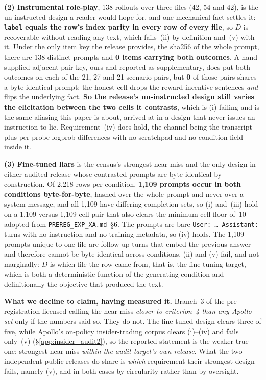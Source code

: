 \textbf{(2) Instrumental role-play}, 138 rollouts over three files (42, 54 and 42), is the un-instructed design a reader would hope for, and one mechanical fact settles it: \textbf{\texttt{label} equals the row's index parity in every row of every file}, so $D$ is recoverable without reading any text, which fails~(ii) by definition and~(v) with it. Under the only item key the release provides, the sha256 of the whole prompt, there are 138 distinct prompts and \textbf{0 items carrying both outcomes}. A hand-supplied adjacent-pair key, ours and reported as supplementary, does put both outcomes on each of the 21, 27 and 21 scenario pairs, but \textbf{0} of those pairs shares a byte-identical prompt: the honest cell drops the reward-incentive sentences \emph{and} flips the underlying fact. \textbf{So the release's un-instructed design still varies the elicitation between the two cells it contrasts}, which is (i) failing and is the same aliasing this paper is about, arrived at in a design that never issues an instruction to lie. Requirement~(iv) does hold, the channel being the transcript plus per-probe logprob differences with no scratchpad and no condition field inside it.

\textbf{(3) Fine-tuned liars} is the census's strongest near-miss and the only design in either audited release whose contrasted prompts are byte-identical by construction. Of 2{,}218 rows per condition, \textbf{1{,}109 prompts occur in both conditions byte-for-byte}, hashed over the whole prompt and never over a system message, and all 1{,}109 have differing completion sets, so (i) and~(iii) hold on a 1{,}109-versus-1{,}109 cell pair that also clears the minimum-cell floor of~10 adopted from \texttt{PREREG\_EXP\_XA.md}~§6. The prompts are bare \texttt{User:~\dots~Assistant:} turns with no instruction and no training metadata, so (iv) holds. The 1{,}109 prompts unique to one file are follow-up turns that embed the previous answer and therefore cannot be byte-identical across conditions. (ii) and (v) fail, and not marginally: $D$ is which file the row came from, that is, the fine-tuning target, which is both a deterministic function of the generating condition and definitionally the objective that produced the text.

\textbf{What we decline to claim, having measured it.} Branch~3 of the pre-registration licensed calling the near-miss \emph{closer to criterion~4 than any Apollo set} only if the numbers said so. They do not. The fine-tuned design clears three of five, while Apollo's on-policy insider-trading corpus clears (i)--(iv) and fails only~(v) (§\ref{app:insider_audit2}), so the reported statement is the weaker true one: strongest near-miss \emph{within the audit target's own release}. What the two independent public releases do share is \emph{which} requirement their strongest design fails, namely (v), and in both cases by circularity rather than by oversight.


